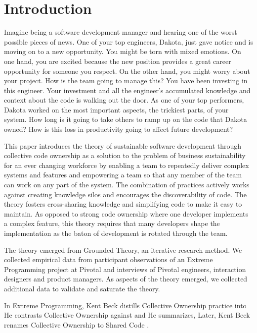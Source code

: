 
\section{Introduction}

Imagine being a software development manager and hearing one of the worst possible pieces of news.  One of your top engineers, Dakota, just gave notice and is moving on to a new opportunity. You might be torn with mixed emotions. On one hand, you are excited because the new position provides a great career opportunity for someone you respect. On the other hand, you might worry about your project. How is the team going to manage this? You have been investing in this engineer. Your investment and all the engineer's accumulated knowledge and context about the code is walking out the door.  As one of your top performers, Dakota worked on the most important aspects, the trickiest parts, of your system. How long is it going to take others to ramp up on the code that Dakota owned? How is this loss in productivity going to affect future development? 

This paper introduces the theory of sustainable software development through collective code ownership as a solution to the problem of business sustainability for an ever changing workforce by enabling a team to repeatedly deliver complex systems and features and empowering a team so that any member of the team can work on any part of the system. The combination of practices actively works against creating knowledge silos and encourages the discoverability of code. The theory fosters cross-sharing knowledge and simplifying code to make it easy to maintain. As opposed to strong code ownership where one developer implements a complex feature, this theory requires that many developers shape the implementation as the baton of development is rotated through the team.

The theory emerged from Grounded Theory, an iterative research method. We collected empirical data from participant observations of an Extreme Programming project at Pivotal and interviews of Pivotal engineers, interaction designers and product managers. As aspects of the theory emerged, we collected additional data to validate and saturate the theory.

In Extreme Programming, Kent Beck distills Collective Ownership practice into  He contrasts Collective Ownership against  and  He summarizes,   \cite{ExtremeProgramming2000} Later, Kent Beck renames Collective Ownership to Shared Code \cite{ExtremeProgramming2004}. 

